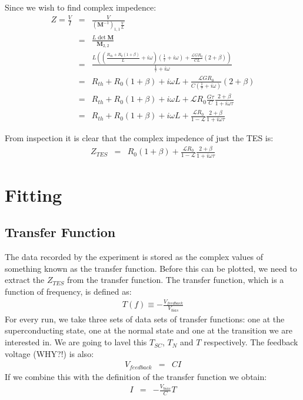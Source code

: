 \documentclass[letterpaper,10pt]{article}
\begin{document}
Since we wish to find complex impedence:
\begin{eqnarray}
	Z = \frac{V}{I} &=& \frac{V}{(\mathbf{M}^{-1})_{1,1} \frac{V}{L}} \\
	&=& \frac{L \det \mathbf{M}}{\mathbf{M}_{2,2}} \\
	&=& \frac{L \left(\left(\frac{R_{th} + R_0(1 + \beta)}{L} + i\omega\right) \left(\frac{1}{\tau} + i\omega\right) + \frac{\mathcal{L} G R_0}{C L} (2+\beta) \right) } {\frac{1}{\tau} + i\omega} \\
	&=& R_{th} + R_0(1 + \beta) + i\omega L + \frac{\mathcal{L} G R_0}{C \left(\frac{1}{\tau} + i\omega\right)} (2 + \beta) \\
	&=& R_{th} + R_0(1 + \beta) + i\omega L + \mathcal{L} R_0 \frac{G \tau}{C} \frac{2 + \beta}{1 + i\omega\tau} \\
	&=& R_{th} + R_0(1 + \beta) + i\omega L + \frac{\mathcal{L} R_0}{1 - \mathcal{L}} \frac{2 + \beta}{1 + i\omega\tau}
\end{eqnarray}

From inspection it is clear that the complex impedence of just the TES is:
\begin{eqnarray}
	Z_{TES} &=& R_0(1 + \beta) + \frac{\mathcal{L} R_0}{1 - \mathcal{L}} \frac{2 + \beta}{1 + i\omega\tau} \label{ztes}
\end{eqnarray}

\section{Fitting}
\subsection{Transfer Function}
The data recorded by the experiment is stored as the complex values of something known as the transfer function. Before this can be plotted, we need to extract the $Z_{TES}$ from the transfer function. The transfer function, which is a function of frequency, is defined as:
\begin{eqnarray}
	T(f) \equiv -\frac{V_{feedback}}{V_{bias}}
\end{eqnarray}
For every run, we take three sets of data sets of transfer functions: one at the superconducting state, one at the normal state and one at the transition we are interested in. We are going to lavel this $T_{SC}$, $T_{N}$ and $T$ respectively.
The feedback voltage (WHY?!) is also:
\begin{eqnarray}
	V_{feedback} &=& C I
\end{eqnarray}
If we combine this with the definition of the transfer function we obtain:
\begin{eqnarray}
	I &=& - \frac{V_{bias}}{C} T
\end{eqnarray}
\end{document}
